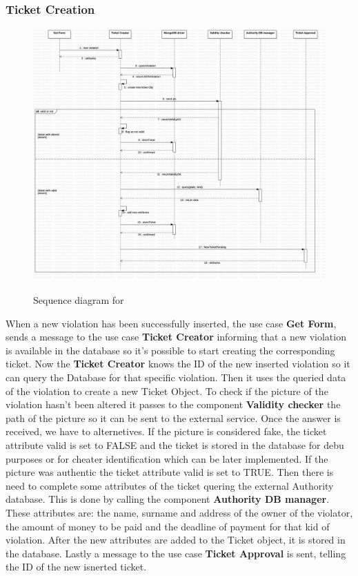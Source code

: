 \subsubsection{Ticket Creation}%
\begin{figure}[H]
\centering
\includegraphics[width=\textwidth]{Images/DDSeqSeverTickCreat.png}
\caption{\label{fig:DDSeqSeverTickCreat}} Sequence diagram for %
\end{figure}

When a new violation has been successfully inserted, the use case \textbf{Get Form}, sends a message to the use case \textbf{Ticket Creator} informing that a new violation is available in the database so it's possible to start creating the corresponding ticket. Now the \textbf{Ticket Creator} knows the ID of the new inserted violation so it can query the Database for that specific violation. Then it uses the queried data of the violation to create a new Ticket Object. To check if the picture of the violation hasn't been altered it passes to the component \textbf{Validity checker} the path of the picture so it can be sent to the external service. Once the answer is received, we have to alternetives. If the picture is considered fake, the ticket attribute \textcolor{poliblue}{valid} is set to FALSE and the ticket is stored in the database for debu purposes or for cheater identification which can be later implemented.
If the picture was authentic the ticket attribute \textcolor{poliblue}{valid} is set to TRUE. Then there is need to complete some attributes of the ticket quering the external Authority database. This is done by calling the component \textbf{Authority DB manager}. These attributes are: the name, surname and address of the owner of the violator, the amount of money to be paid and the deadline of payment for that kid of violation. After the new attributes are added to the Ticket object, it is stored in the database. Lastly a message to the use case \textbf{Ticket Approval} is sent, telling the ID of the new isnerted ticket.





